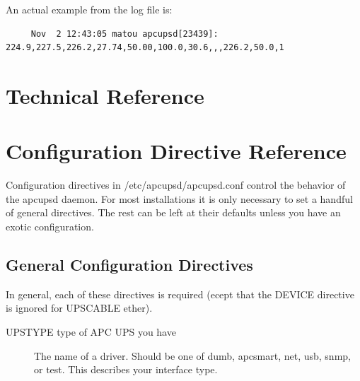 {{{{{{{An actual example from the log file is: 

\footnotesize
\begin{verbatim}
     Nov  2 12:43:05 matou apcupsd[23439]: 224.9,227.5,226.2,27.74,50.00,100.0,30.6,,,226.2,50.0,1
\end{verbatim}
\normalsize

\label{Technical-Reference}

\section*{Technical Reference}

\label{index-Technical-Reference-235}

\label{Configuration-Directive-Reference}

\section*{Configuration Directive Reference}

\label{index-Reference_002c-Directives-236}
\label{index-Configuration_002c-Directives-237}
\label{index-Directives-238}
Configuration directives in /etc/apcupsd/apcupsd.conf control the behavior of
the apcupsd daemon.  For most installations it is only necessary to set a
handful of general directives. The rest can be left at their defaults unless
you have an exotic configuration. 

\label{General-Configuration-Directives}

\subsection*{General Configuration Directives}

\label{index-Directives_002c-General-239}
\label{index-General-Directives-240}
In general, each of these directives is required (ecept that the DEVICE
directive is ignored for UPSCABLE ether).  

\begin{description}

\item [UPSTYPE \lt{}type of APC UPS you have\gt{}]
   The name of a driver.  Should be one of dumb, apcsmart, net, usb, snmp, or
test. This describes your interface type.  


\end{description}}}}}}}}
